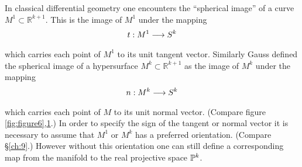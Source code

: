 \documentclass[../main]{subfiles}
\begin{document}
In classical differential geometry one encounters the ``spherical image''
of a curve $M^1\subset \mathbb R^{k+1}$. This is the image of $M^1$ under the mapping
\[t : M^1 \varrightarrow{} S^k\]
which carries each point of $M^1$ to its unit tangent vector. Similarly Gauss defined the spherical image of a hypersurface $M^k \subset \mathbb R^{k+1}$ as the image of $M^k$ under the mapping
\[n : M^k \varrightarrow{} S^k\]
which carries each point of $M$ to its unit normal vector. (Compare figure \ref{fig:figure6},\ref{fig:figure7}.) In order to specify the sign of the tangent or normal vector it is
necessary to assume that $M^1$ or $M^k$ has a preferred orientation. (Compare
\S\ref{ch:9}.) However without this orientation one can still define a corresponding
map from the manifold to the real projective space $\mathbb{P}^k$.

\begin{figure}[ht]
    \centering
    \caption{}
    \label{fig:figure7}
\end{figure}
\begin{figure}[ht]
    \centering
    \caption{}
    \label{fig:figure8}
\end{figure}
\end{document}

